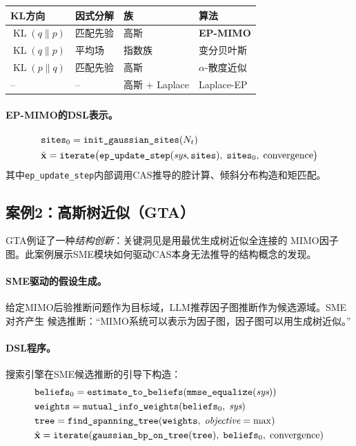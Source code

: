 \documentclass[12pt,a4paper]{article}
\newcommand{\bx}{\mathbf{x}}
\DeclareMathOperator{\KL}{KL}
\begin{document}
\vspace{0.3em}
\begin{tabular}{llll}
  \toprule
  \textbf{KL方向} & \textbf{因式分解} & \textbf{族} & \textbf{算法} \\
  \midrule
  $\KL(q\|p)$ & 匹配先验 & 高斯 & \textbf{EP-MIMO} \\
  $\KL(q\|p)$ & 平均场 & 指数族 & 变分贝叶斯 \\
  $\KL(p\|q)$ & 匹配先验 & 高斯 & $\alpha$-散度近似 \\
  -- & -- & 高斯 + Laplace & Laplace-EP \\
  \bottomrule
\end{tabular}

\paragraph{EP-MIMO的DSL表示。}
\begin{align}
  &\texttt{sites}_0 = \texttt{init\_gaussian\_sites}(N_t) \notag\\
  &\hat{\bx} = \texttt{iterate}\bigl(\texttt{ep\_update\_step}(\textit{sys}, \texttt{sites}),\;
               \texttt{sites}_0,\; \text{convergence}\bigr) \notag
\end{align}
其中\texttt{ep\_update\_step}内部调用CAS推导的腔计算、倾斜分布构造和矩匹配。

\subsection{案例2：高斯树近似（GTA）}
\label{sec:gta}

GTA\cite{gta2006}例证了一种\emph{结构创新}：关键洞见是用最优生成树近似全连接的
MIMO因子图。此案例展示SME模块如何驱动CAS本身无法推导的结构概念的发现。

\paragraph{SME驱动的假设生成。}
给定MIMO后验推断问题作为目标域，LLM推荐因子图推断作为候选源域。SME对齐产生
候选推断：``MIMO系统可以表示为因子图，因子图可以用生成树近似。''

\paragraph{DSL程序。}
搜索引擎在SME候选推断的引导下构造：
\begin{align}
  &\texttt{beliefs}_0 = \texttt{estimate\_to\_beliefs}(\texttt{mmse\_equalize}(\textit{sys})) \notag\\
  &\texttt{weights} = \texttt{mutual\_info\_weights}(\texttt{beliefs}_0,\; \textit{sys}) \notag\\
  &\texttt{tree} = \texttt{find\_spanning\_tree}(\texttt{weights},\; \textit{objective}=\max) \notag\\
  &\hat{\bx} = \texttt{iterate}(\texttt{gaussian\_bp\_on\_tree}(\texttt{tree}),\;\texttt{beliefs}_0,\;\text{convergence}) \notag
\end{align}
\end{document}
